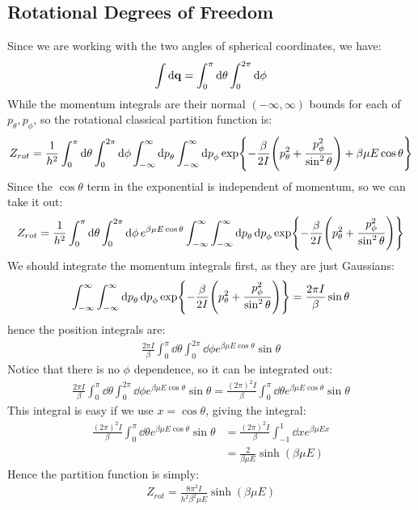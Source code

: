\documentclass[12pt]{article}
\begin{document}
\subsection{Rotational Degrees of Freedom}
Since we are working with the two angles of spherical coordinates, we have:
\begin{align*}
  \int\dd{\vb{q}}=\int_0^\pi\dd{\theta}\int_0^{2\pi}\dd{\phi}
\end{align*}
While the momentum integrals are their normal $(-\infty,\infty)$ bounds for each of $p_\theta,p_\phi$, so the rotational classical partition function is:
\begin{align*}
  Z_{rot}=\frac1{h^2}\int_0^\pi\dd{\theta}\int_0^{2\pi}\dd{\phi}
  \int_{-\infty}^\infty\dd{p}_\theta\int_{-\infty}^\infty\dd{p}_\phi
  \exp{-\frac{\beta}{2I}\qty(p_\theta^2+\frac{p_\phi^2}{\sin^2\theta})+\beta\mu E\cos\theta}
\end{align*}
Since the $\cos\theta$ term in the exponential is independent of momentum, so we can take it out:
\begin{align*}
  Z_{rot}=\frac1{h^2}\int_0^\pi\dd{\theta}\int_0^{2\pi}\dd{\phi}
  e^{\beta\mu E\cos\theta}
  \int_{-\infty}^\infty\int_{-\infty}^\infty\dd{p}_\theta\dd{p}_\phi
  \exp{-\frac{\beta}{2I}\qty(p_\theta^2+\frac{p_\phi^2}{\sin^2\theta})}
\end{align*}
We should integrate the momentum integrals first, as they are just Gaussians:
\begin{align*}
  \int_{-\infty}^\infty\int_{-\infty}^\infty\dd{p}_\theta\dd{p}_\phi
  \exp{-\frac{\beta}{2I}\qty(p_\theta^2+\frac{p_\phi^2}{\sin^2\theta})}
  =\frac{2\pi I}{\beta}\sin\theta
\end{align*}
hence the position integrals are:
\begin{align*}
  \frac{2\pi I}{\beta}\int_0^\pi\dd{\theta}\int_0^{2\pi}\dd{\phi}
  e^{\beta\mu E\cos\theta}\sin\theta
\end{align*}
Notice that there is no $\phi$ dependence, so it can be integrated out:
\begin{align*}
  \frac{2\pi I}{\beta}\int_0^\pi\dd{\theta}\int_0^{2\pi}\dd{\phi}
  e^{\beta\mu E\cos\theta}\sin\theta=
  \frac{(2\pi)^2 I}{\beta}\int_0^\pi\dd{\theta}
  e^{\beta\mu E\cos\theta}\sin\theta
\end{align*}
This integral is easy if we use $x=\cos\theta$, giving the integral:
\begin{align*}
  \frac{(2\pi)^2 I}{\beta}\int_0^\pi\dd{\theta}
  e^{\beta\mu E\cos\theta}\sin\theta&=
  \frac{(2\pi)^2 I}{\beta}\int_{-1}^1\dd{x}
  e^{\beta\mu Ex}\\
  &=\frac2{\beta\mu E}\sinh(\beta\mu E)
\end{align*}
Hence the partition function is simply:
\begin{align}
  \boxed{Z_{rot}=\frac{8\pi^2I}{h^2\beta^2\mu E}\sinh(\beta\mu E)}
\end{align}
\end{document}
